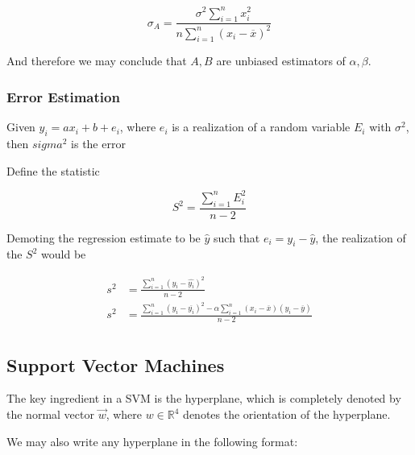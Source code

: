 \documentclass[10pt]{article}
\begin{document}
\begin{equation}
	\sigma_A = \frac{\sigma^2 \sum^n_{i=1}x_i^2}{n\sum^n_{i=1}(x_i - \overline{x})^2}
\end{equation}



And therefore we may conclude that $ A, B $ are unbiased estimators of $ \alpha, \beta $.





\subsubsection{Error Estimation}

\begin{blockquote}
	Given $ y_i = ax_i + b + e_i $, where $ e_i $ is a realization of a random variable $ E_i $ with $ \sigma^2 $, then $ sigma^2 $ is the error
\end{blockquote}

Define the statistic

\begin{equation}
	S^2 = \frac{\sum^n_{i=1} E_i^2}{n-2}
\end{equation}

Demoting the regression estimate to be $ \hat{y} $ such that $ e_i = y_i - \hat{y} $, the realization of the $ S^2 $ would be


\begin{equation}
	\begin{split}
		s^2 &= \frac{\sum^n_{i=1} (y_i - \hat{y_i})^2}{n-2}  \\
		s^2 &= \frac{\sum^n_{i=1} (y_i - \overline{y_i})^2 - \alpha\sum^n_{i=1} (x_i - \overline{x})(y_i - \overline{y}) }{n-2}  \\
	\end{split}
\end{equation}




\subsection{Support Vector Machines}
The key ingredient in a SVM is the hyperplane, which is completely denoted by the normal vector $\vec{w} $, where $ w \in \mathbb{R}^4 $ denotes the orientation of the hyperplane.

We may also write any hyperplane in the following format:
\end{document}

